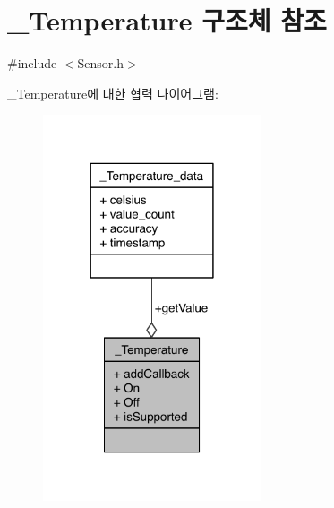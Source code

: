 \hypertarget{struct___temperature}{\section{\-\_\-\-Temperature 구조체 참조}
\label{struct___temperature}
}


{\ttfamily \#include $<$Sensor.\-h$>$}



\-\_\-\-Temperature에 대한 협력 다이어그램\-:
\nopagebreak
\begin{figure}[H]
\begin{center}
\leavevmode
\includegraphics[width=182pt]{d8/db7/struct___temperature__coll__graph}
\end{center}
\end{figure}
